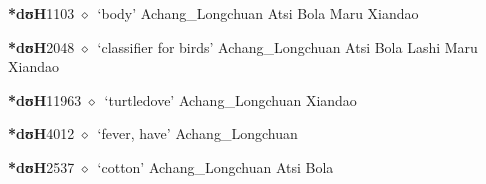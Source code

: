   \begin{list}{}{\leftmargin=1.5em \itemindent=-1.5em}
  \item {\footnotesize \textbf{*dʊH}}{\tiny 1103}
         $\diamond$~`body'
         Achang\_Longchuan 
\hspace{1ex}
         Atsi 
\hspace{1ex}
         Bola 
\hspace{1ex}
         Maru 
\hspace{1ex}
         Xiandao 
  \item {\footnotesize \textbf{*dʊH}}{\tiny 2048}
\hspace{1ex}
         $\diamond$~`classifier for birds'
         Achang\_Longchuan 
\hspace{1ex}
         Atsi 
\hspace{1ex}
         Bola 
\hspace{1ex}
         Lashi 
\hspace{1ex}
         Maru 
\hspace{1ex}
         Xiandao 
  \item {\footnotesize \textbf{*dʊH}}{\tiny 11963}
\hspace{1ex}
         $\diamond$~`turtledove'
         Achang\_Longchuan 
\hspace{1ex}
         Xiandao 
  \item {\footnotesize \textbf{*dʊH}}{\tiny 4012}
\hspace{1ex}
         $\diamond$~`fever, have'
         Achang\_Longchuan 
  \item {\footnotesize \textbf{*dʊH}}{\tiny 2537}
\hspace{1ex}
         $\diamond$~`cotton'
         Achang\_Longchuan 
\hspace{1ex}
         Atsi 
\hspace{1ex}
         Bola 

\end{list}
